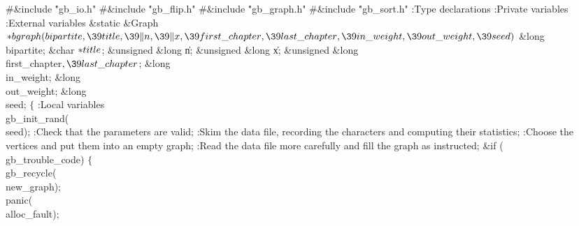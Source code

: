 \Y\B\8\#\&{include} \.{"gb\_io.h"}\6
\8\#\&{include} \.{"gb\_flip.h"}\6
\8\#\&{include} \.{"gb\_graph.h"}\6
\8\#\&{include} \.{"gb\_sort.h"}\6
\ATH\7
:Type declarations\X\6
:Private variables\X\6
:External variables\X\7
\1\1\&{static} \&{Graph} ${}{*}\\{bgraph}(\\{bipartite},\39\\{title},\39\|n,\39%
\|x,\39\\{first\_chapter},\39\\{last\_chapter},\39\\{in\_weight},\39\\{out%
\_weight},\39\\{seed}){}$\6
\&{long} \\{bipartite};\6
\&{char} ${}{*}\\{title}{}$;\6
\&{unsigned} \&{long} \|n;\6
\&{unsigned} \&{long} \|x;\6
\&{unsigned} \&{long} \\{first\_chapter}${},\39\\{last\_chapter}{}$;\6
\&{long} \\{in\_weight};\6
\&{long} \\{out\_weight};\6
\&{long} \\{seed};\2\2\6
${}\{{}$\5
\1:Local variables\X\7
\\{gb\_init\_rand}(\\{seed});\6
:Check that the parameters are valid\X;\6
:Skim the data file, recording the characters and computing their
statistics\X;\6
:Choose the vertices and put them into an empty graph\X;\6
:Read the data file more carefully and fill the graph as instructed\X;\6
\&{if} (\\{gb\_trouble\_code})\5
${}\{{}$\1\6
\\{gb\_recycle}(\\{new\_graph});\6
\\{panic}(\\{alloc\_fault});\6
